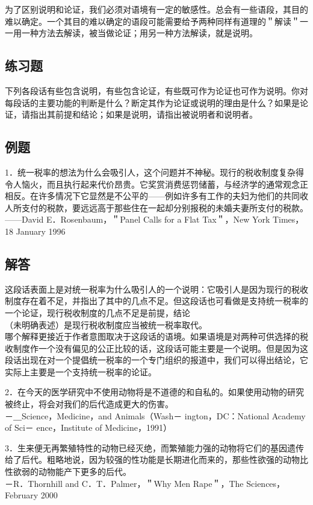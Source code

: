为了区别说明和论证，我们必须对语境有一定的敏感性。总会有一些语段，其目的难以确定。一个其目的难以确定的语段可能需要给予两种同样有道理的＂解读＂一一用一种方法去解读，被当做论证；用另一种方法解读，就是说明。

\subsection{练习题}
下列各段话有些包含说明，有些包含论证，有些既可作为论证也可作为说明。你对每段话的主要功能的判断是什么？断定其作为论证或说明的理由是什么？如果是论证，请指出其前提和结论；如果是说明，请指出被说明者和说明者。

\subsection{例题}
1．统一税率的想法为什么会吸引人，这个问题并不神秘。现行的税收制度复杂得令人恼火，而且执行起来代价昂贵。它奖赏消费惩罚储蓄，与经济学的通常观念正相反。在许多情况下它显然是不公平的——例如许多有工作的夫妇为他们的共同收人所支付的税款，要远远高于那些住在一起却分别报税的未婚夫妻所支付的税款。\\
——David E．Rosenbaum，＂Panel Calls for a Flat Tax＂，New York Times， 18 January 1996

\subsection{解答}
这段话表面上是对统一税率为什么吸引人的一个说明：它吸引人是因为现行的税收制度存在着不足，并指出了其中的几点不足。但这段话也可看做是支持统一税率的一个论证，现行税收制度的几点不足是前提，结论\\
（未明确表述）是现行税收制度应当被统一税率取代。\\
哪个解释更接近于作者意图取决于这段话的语境。如果语境是对两种可供选择的税收制度作一个没有偏见的公正比较的话，这段话可能主要是一个说明。但是因为这段话出现在对一个提倡统一税率的一个专门组织的报道中，我们可以得出结论，它实际上主要是一个支持统一税率的论证。

2．在今天的医学研究中不使用动物将是不道德的和自私的。如果使用动物的研究被终止，将会对我们的后代造成更大的伤害。\\
－＿Science，Medicine，and Animals（Wash－ ington，DC：National Academy of Sci－ ence，Institute of Medicine，1991）

3．生来便无再繁殖特性的动物已经灭绝，而繁殖能力强的动物将它们的基因遗传给了后代。粗略地说，因为较强的性功能是长期进化而来的，那些性欲强的动物比性欲弱的动物能产下更多的后代。\\
－R．Thornhill and C．T．Palmer，＂Why Men Rape＂，The Sciences，February 2000

